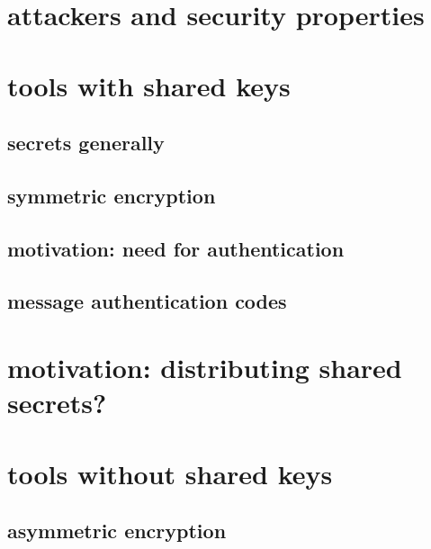 \date{}
\title{}
\date{}

\begin{frame}
    \titlepage
\end{frame}

\section{attackers and security properties}



\section{tools with shared keys}

\subsection{secrets generally}


\subsection{symmetric encryption}


\subsection{motivation: need for authentication}


\subsection{message authentication codes}


\section{motivation: distributing shared secrets?}


\section{tools without shared keys}

\subsection{asymmetric encryption}

